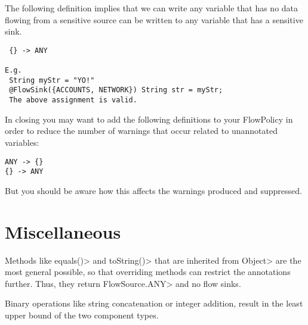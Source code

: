 The following definition implies that we can write
any variable that has no data flowing from a
sensitive source can be written to any variable that
has a sensitive sink.
\begin{Verbatim}
 {} -> ANY

E.g.
 String myStr = "YO!"
 @FlowSink({ACCOUNTS, NETWORK}) String str = myStr;
 The above assignment is valid.
\end{Verbatim}

In closing you may want to add the following definitions
to your FlowPolicy in order to reduce the number of
warnings that occur related to unannotated variables:
\begin{Verbatim}
ANY -> {}
{} -> ANY
\end{Verbatim}

But you should be aware how this affects the
warnings produced and suppressed.

\section{Miscellaneous}

Methods like \<equals()> and \<toString()> that are inherited from
\<Object> are the most general possible, so that overriding methods
can restrict the annotations further. Thus, they
return \<FlowSource.ANY> and no flow sinks.

Binary operations like string concatenation or integer addition,
result in the least upper bound of the two component types.





